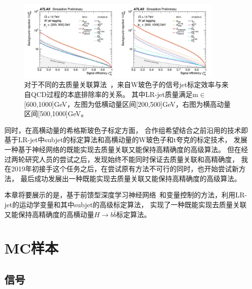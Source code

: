 \begin{figure}
  \begin{center}
    \includegraphics[width=0.9\textwidth]{figuresXbb/ANN.jpg}
  \end{center}
  \caption{对于不同的去质量关联算法~\cite{ATL-PHYS-PUB-2018-014}，来自W玻色子的信号jet标定效率与来自QCD过程的本底排除率的关系。
其中LR-jet质量满足m$\in$[600,1000]GeV，左图为低横动量区间[200,500]GeV，右图为横高动量区间[500,1000]GeV。}
    \label{fig:ANNROC}
\end{figure}


同时，在高横动量的希格斯玻色子标定方面，
合作组希望结合之前沿用的技术即基于LR-jet中subjet的标定算法和高横动量的W玻色子和t夸克的标定技术，
发展一种基于神经网络的既能实现去质量关联又能保持高精确度的高级算法。
但在经过两轮研究人员的尝试之后，发现始终不能同时保证去质量关联和高精确度，
我在2019年初接手这个任务之后，在尝试原有方法不可行的同时，也开始尝试新方法，
最后成功发展出一种既能实现去质量关联又能保持高精确度的高级算法。

本章将要展示的是，基于前馈型深度学习神经网络~\cite{FDNN}和变量控制的方法，利用LR-jet的运动学变量和其中subjet的高级标定算法，
实现了一种既能实现去质量关联又能保持高精确度的高横动量$H\rightarrow b\bar{b}$标定算法。

\section{MC样本}
\label{sec:XbbSim}

\subsection{信号}
\label{sec:XbbSimS}

